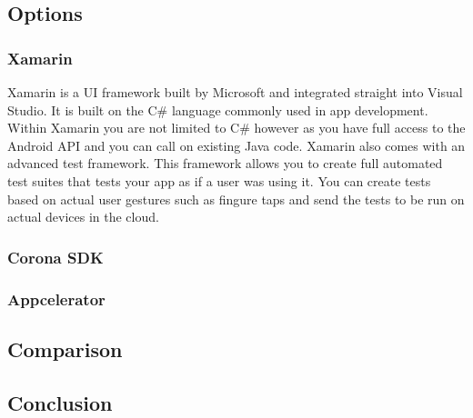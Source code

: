 \documentclass[onecolumn, draftclsnofoot,10pt, compsoc]{IEEEtran}
\begin{document}
	\subsection{Options}
		\subsubsection{Xamarin}
			Xamarin is a UI framework built by Microsoft and integrated straight into Visual Studio.
			It is built on the C# language commonly used in app development.
			Within Xamarin you are not limited to C# however as you have full access to the Android API and you can call on existing Java code\cite{xamarin_platform}.
			Xamarin also comes with an advanced test framework.
			This framework allows you to create full automated test suites that tests your app as if a user was using it.
			You can create tests based on actual user gestures such as fingure taps and send the tests to be run on actual devices in the cloud\cite{xamarin_test}.

		\subsubsection{Corona SDK}


		\subsubsection{Appcelerator}



	\subsection{Comparison}


	\subsection{Conclusion}



\end{document}
